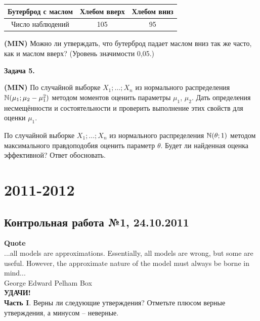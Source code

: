 \documentclass[12pt, a4paper]{article}\usepackage[]{graphicx}\usepackage[]{color}
\newenvironment{enumerate*}{
	\begin{enumerate}
		\setlength{\itemsep}{0pt}
		\setlength{\parskip}{0pt}
		\setlength{\parsep}{0pt}
	}{\end{enumerate}}
\newcommand{\MIN}{\textbf{(MIN)}{}}
\newenvironment{centered}{%
	\begin{list}{}{%
			\topsep0pt
		}
		\centering
		\item[]
	}
	{\end{list}}
\begin{document}
	\begin{centered}
		\begin{tabular}{|c|c|c|}
			\hline
			Бутерброд с маслом & Хлебом вверх & Хлебом вниз \\ \hline
			Число наблюдений & 105 & 95 \\ \hline
		\end{tabular}\end{centered}\par\smallskip
		\MIN{} Можно ли утверждать, что бутерброд падает маслом вниз так же часто, как и маслом вверх? (Уровень значимости 0{,}05.)
		\par\medskip
		\textbf{Задача 5.}
		\begin{enumerate*}
			\item \MIN{} По случайной выборке $X_1;\ldots;X_n$ из нормального распределения $\mathbb N(\mu_1;\mu_2-\mu_1^2)$ методом моментов оценить параметры $\mu_1$, $\mu_2$. Дать определения несмещённости и состоятельности и проверить выполнение этих свойств для оценки $\mu_1$.
			\item По случайной выборке $X_1;\ldots;X_n$ из нормального распределения $\mathbb N(\theta;1)$ методом максимального правдоподобия оценить параметр $\theta$. Будет ли найденная оценка эффективной? Ответ обосновать.
		\end{enumerate*}





		\section{2011-2012}

		\subsection{Контрольная работа №1, 24.10.2011}

		\textbf{Quote}\\
		...all models are approximations. Essentially, all models are wrong, but some are useful. However, the approximate nature of the model must always be borne in mind...\\
		George Edward Pelham Box\\

		\textbf{УДАЧИ!} \\

		\textbf{Часть I}. Верны ли следующие утверждения? Отметьте плюсом верные утверждения, а минусом -- неверные. \\
\end{document}
